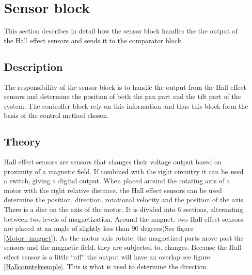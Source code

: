 \section{Sensor block}
This section describes in detail how the sensor block handles the the output of the Hall effect sensors and sends it to the comparator block.

\subsection{Description}
The responsibility of the sensor block is to handle the output from the Hall effect sensors and determine the position of both the pan part and the tilt part of the system. The controller block rely on this information and thus this block form the basis of the control method chosen.

\subsection{Theory}
Hall effect sensors are sensors that changes their voltage output based on proximity of a magnetic field. If combined with the right circuitry it can be used a switch, giving a digital output. When placed around the rotating axis of a motor with the right relative distance, the Hall effect sensors can be used determine the position, direction, rotational velocity and the position of the axis.
There is a disc on the axis of the motor. It is divided into 6 sections, alternating between two levels of magnetization. Around the magnet, two Hall effect sensors are placed at an angle of slightly less than 90 degrees(See figure \ref{Motor_magnet}). As the motor axis rotate, the magnetized parts move past the sensors and the magnetic field, they are subjected to, changes. Because the Hall effect sensor is a little “off” the output will have an overlap see figure \ref{Hallcounteksemple}. This is what is used to determine the direction.

